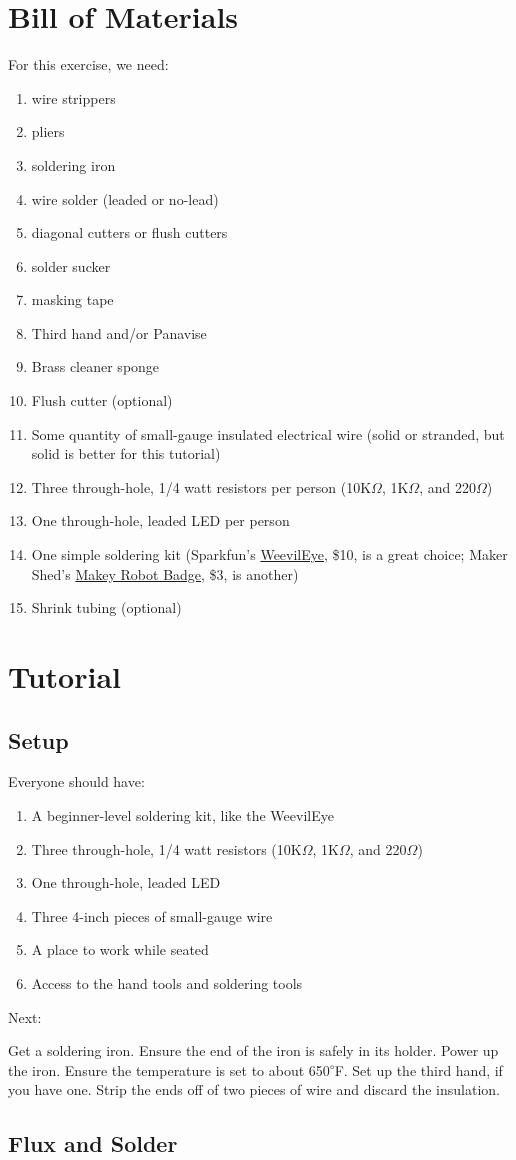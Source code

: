 \documentclass[12pt]{article}
\newcommand{\degs}[1]{\textsuperscript{$\circ$}#1}
\newcommand{\+}{\item}
\begin{document}
\section{Bill of Materials}

For this exercise, we need:
\begin{enumerate}
\+ wire strippers
\+ pliers
\+ soldering iron
\+ wire solder (leaded or no-lead)
\+ diagonal cutters or flush cutters
\+ solder sucker
\+ masking tape
\+ Third hand and/or Panavise
\+ Brass cleaner sponge
\+ Flush cutter (optional)
\+ Some quantity of small-gauge insulated electrical wire (solid or stranded, but solid is better for this tutorial)
\+ Three through-hole, 1/4 watt resistors per person (10K$\Omega$, 1K$\Omega$, and 220$\Omega$)
\+ One through-hole, leaded LED per person
\+ One simple soldering kit (Sparkfun's {\color{webblue}\href{https://www.sparkfun.com/products/10723}{WeevilEye}}, \$10, is a great choice; Maker Shed's {\color{webblue}\href{http://www.makershed.com/products/learn-to-solder-skill-badge-kit}{Makey Robot Badge}}, \$3, is another)
\+ Shrink tubing (optional)
\end{enumerate}


\section{Tutorial}

\subsection{Setup}

Everyone should have:

\begin{enumerate}
\+ A beginner-level soldering kit, like the WeevilEye
\+ Three through-hole, 1/4 watt resistors (10K$\Omega$, 1K$\Omega$, and 220$\Omega$)
\+ One through-hole, leaded LED
\+ Three 4-inch pieces of small-gauge wire
\+ A place to work while seated
\+ Access to the hand tools and soldering tools
\end{enumerate}

Next:

Get a soldering iron. Ensure the end of the iron is safely in its holder. Power up the iron. Ensure the temperature is set to about 650\degs{F}.  Set up the third hand, if you have one. Strip the ends off of two pieces of wire and discard the insulation.

\subsection{Flux and Solder}
\end{document}
